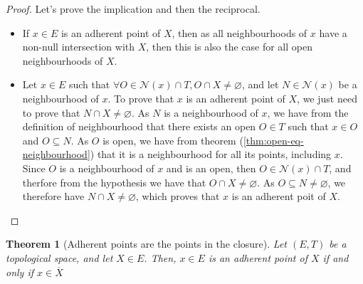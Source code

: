 \documentclass{article}
\newtheorem{theorem}{Theorem}[section]
\theoremstyle{definition}
\theoremstyle{remark}
\theoremstyle{example}
\theoremstyle{notation}
\begin{document}
\begin{proof}
		Let's prove the implication and then the reciprocal.
		\begin{itemize}
				\item If $x \in E$ is an adherent point of $X$, then as all neighbourhoods of $x$ have a non-null intersection with $X$, then this is also the case for all open neighbourhoods of $X$.
				\item Let $x \in E$ such that $\forall O \in \mathcal{N}(x) \cap T, O \cap X \neq \varnothing$, and let $N \in \mathcal{N}(x)$ be a neighbourhood of $x$. To prove that $x$ is an adherent point of $X$, we just need to prove that $N \cap X \neq \varnothing$. As $N$ is a neighbourhood of $x$, we have from the definition of neighbourhood that there exists an open $O \in T$ such that $x \in O$ and $O \subseteq N$. As $O$ is open, we have from theorem (\ref{thm:open-eq-neighbourhood}) that it is a neighbourhood for all its points, including $x$. Since $O$ is a neighbourhood of $x$ and is an open, then $O \in \mathcal{N}(x) \cap T$, and therfore from the hypothesis we have that $O \cap X \neq \varnothing$. As $O \subseteq N \neq \varnothing$, we therefore have $N \cap X \neq \varnothing$, which proves that $x$ is an adherent poit of $X$.
		\end{itemize}
\end{proof}

\begin{theorem}[Adherent points are the points in the closure]
		Let $(E, T)$ be a topological space, and let $X \in E$. Then, $x \in E$ is an adherent point of $X$ if and only if $x \in \overline{X}$
\end{theorem}
\end{document}
